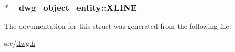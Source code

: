 \hypertarget{struct__dwg__object__entity_a18fd019deb396b3891a574549d0b6b88}{
\subsubsection[{\-X\-L\-I\-N\-E}]{$\ast$ {\bf \-\_\-dwg\-\_\-object\-\_\-entity\-::\-X\-L\-I\-N\-E}}}\label{struct__dwg__object__entity_a18fd019deb396b3891a574549d0b6b88}


\-The documentation for this struct was generated from the following file\-:\begin{DoxyCompactItemize}
\item 
src/\hyperlink{dwg_8h}{dwg.\-h}\end{DoxyCompactItemize}
